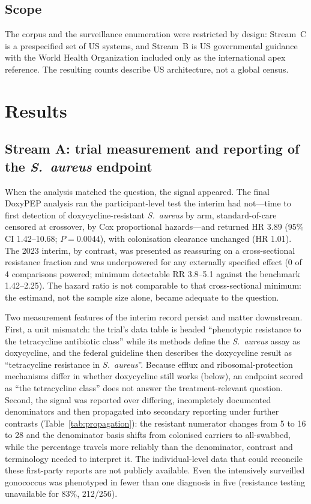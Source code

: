 \documentclass[12pt,a4paper]{article}
\newcommand{\sa}{\emph{S.~aureus}}
\begin{document}
\subsection*{Scope}
The corpus and the surveillance enumeration were restricted by design: Stream~C is
a prespecified set of US systems, and Stream~B is US governmental guidance with the
World Health Organization included only as the international apex reference. The
resulting counts describe US architecture, not a global census.

\section*{Results}

\subsection*{Stream A: trial measurement and reporting of the \sa{} endpoint}
When the analysis matched the question, the signal appeared. The final DoxyPEP
analysis ran the participant-level test the interim had not---time to first
detection of doxycycline-resistant \sa{} by arm, standard-of-care censored at
crossover, by Cox proportional hazards---and returned HR 3.89 (95\% CI
1.42--10.68; $P=0.0044$), with colonisation clearance unchanged (HR
1.01).\cite{luetkemeyer2025} The 2023 interim, by contrast, was presented as reassuring
on a cross-sectional resistance fraction and was underpowered for any externally
specified effect (0 of 4 comparisons powered; minimum detectable RR 3.8--5.1
against the benchmark 1.42--2.25). The hazard ratio is not comparable to that
cross-sectional minimum: the estimand, not the sample size alone, became adequate
to the question.

Two measurement features of the interim record persist and matter downstream.
First, a unit mismatch: the trial's data table is headed ``phenotypic resistance
to the tetracycline antibiotic class'' while its methods define the \sa{} assay
as doxycycline, and the federal guideline then describes the doxycycline result
as ``tetracycline resistance in \sa{}''.\cite{cdc2024doxypep} Because efflux and
ribosomal-protection mechanisms differ in whether doxycycline still works
(below), an endpoint scored as ``the tetracycline class'' does not answer the
treatment-relevant question. Second, the signal was reported over differing,
incompletely documented denominators and then propagated into secondary reporting
under further contrasts (Table~\ref{tab:propagation}): the resistant numerator
changes from 5 to 16 to 28 and the denominator basis shifts from colonised
carriers to all-swabbed, while the percentage travels more reliably than the
denominator, contrast and terminology needed to interpret it. The individual-level
data that could reconcile these first-party reports are not publicly
available.\cite{luetkemeyer2023} Even the intensively surveilled gonococcus was
phenotyped in fewer than one diagnosis in five (resistance testing unavailable for
83\%, 212/256).\cite{luetkemeyer2023croi}
\end{document}
